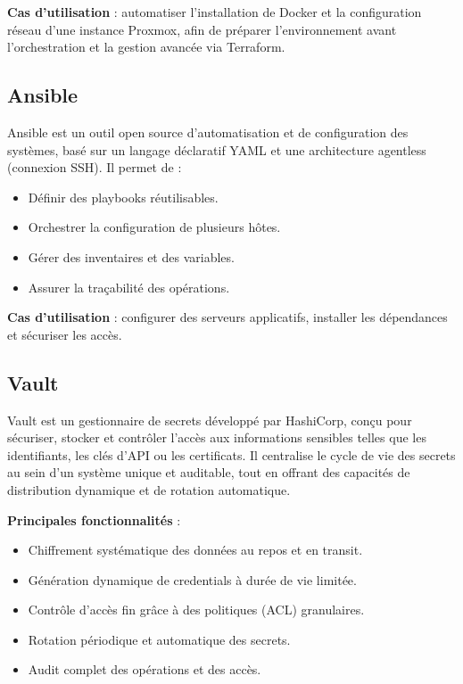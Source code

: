 \textbf{Cas d’utilisation} : automatiser l’installation de Docker et la configuration réseau d’une instance Proxmox, afin de préparer l’environnement avant l’orchestration et la gestion avancée via Terraform.

\subsection{Ansible}

Ansible est un outil open source d’automatisation et de configuration des systèmes, basé sur un langage déclaratif YAML et une architecture agentless (connexion SSH). Il permet de :
\begin{itemize}
	\item Définir des playbooks réutilisables.
	\item Orchestrer la configuration de plusieurs hôtes.
	\item Gérer des inventaires et des variables.
	\item Assurer la traçabilité des opérations.
\end{itemize}

\textbf{Cas d’utilisation} : configurer des serveurs applicatifs, installer les dépendances et sécuriser les accès.

\subsection{Vault}

Vault est un gestionnaire de secrets développé par HashiCorp, conçu pour sécuriser, stocker et contrôler l’accès aux informations sensibles telles que les identifiants, les clés d’API ou les certificats. Il centralise le cycle de vie des secrets au sein d’un système unique et auditable, tout en offrant des capacités de distribution dynamique et de rotation automatique.

\textbf{Principales fonctionnalités} :
\begin{itemize}
	\item Chiffrement systématique des données au repos et en transit.
	\item Génération dynamique de credentials à durée de vie limitée.
	\item Contrôle d’accès fin grâce à des politiques (ACL) granulaires.
	\item Rotation périodique et automatique des secrets.
	\item Audit complet des opérations et des accès.
\end{itemize}

